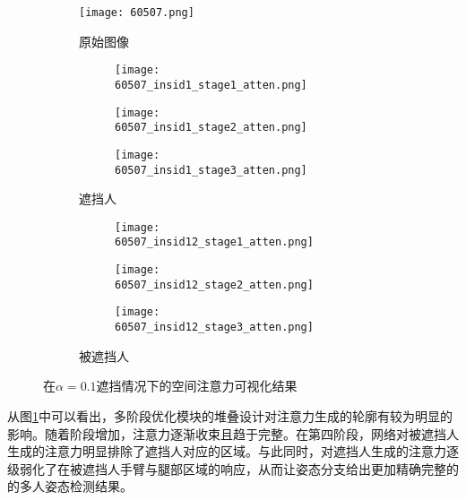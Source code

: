 \begin{figure}[H]
	\centering
	\begin{subfigure}{0.3\linewidth}
		\texttt{[image: 60507.png]}
		\caption{原始图像}
	\end{subfigure}
	\begin{subfigure}{0.3\textwidth}
		\centering
		\begin{subfigure}{\linewidth}
			\texttt{[image: 60507\_insid1\_stage1\_atten.png]}
		\end{subfigure}
		\vskip2pt
		\begin{subfigure}{\linewidth}
			\texttt{[image: 60507\_insid1\_stage2\_atten.png]}
		\end{subfigure}
		\vskip2pt
		\begin{subfigure}{\linewidth}
			\texttt{[image: 60507\_insid1\_stage3\_atten.png]}
		\end{subfigure}
		\caption{遮挡人}
	\end{subfigure}
	\begin{subfigure}{0.3\textwidth}
		\centering
		\begin{subfigure}{\linewidth}
			\texttt{[image: 60507\_insid12\_stage1\_atten.png]}
		\end{subfigure}
		\vskip2pt
		\begin{subfigure}{\linewidth}
			\texttt{[image: 60507\_insid12\_stage2\_atten.png]}
		\end{subfigure}
		\vskip2pt
		\begin{subfigure}{\linewidth}
			\texttt{[image: 60507\_insid12\_stage3\_atten.png]}
		\end{subfigure}
		\caption{被遮挡人}
	\end{subfigure}
	\begin{minipage}{0.05\linewidth}
		
		\vskip2cm
		
		\vskip2cm
	\end{minipage}
	\caption{在$\alpha=0.1$遮挡情况下的空间注意力可视化结果}
	\label{fig:attenvis}
\end{figure}

从图\ref{fig:attenvis}中可以看出，多阶段优化模块的堆叠设计对注意力生成的轮廓有较为明显的影响。随着阶段增加，注意力逐渐收束且趋于完整。在第四阶段，网络对被遮挡人生成的注意力明显排除了遮挡人对应的区域。与此同时，对遮挡人生成的注意力逐级弱化了在被遮挡人手臂与腿部区域的响应，从而让姿态分支给出更加精确完整的的多人姿态检测结果。

